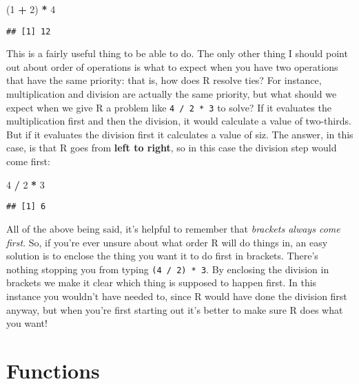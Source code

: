 \documentclass[]{book}
\newenvironment{Shaded}{\begin{snugshade}}{\end{snugshade}}
\newcommand{\DecValTok}[1]{\textcolor[rgb]{0.00,0.00,0.81}{#1}}
\newcommand{\NormalTok}[1]{#1}
\newcommand{\OperatorTok}[1]{\textcolor[rgb]{0.81,0.36,0.00}{\textbf{#1}}}
\newcommand{\StringTok}[1]{\textcolor[rgb]{0.31,0.60,0.02}{#1}}
\begin{document}
\begin{Shaded}
\begin{Highlighting}[]
\NormalTok{(}\DecValTok{1} \OperatorTok{+}\StringTok{ }\DecValTok{2}\NormalTok{) }\OperatorTok{*}\StringTok{ }\DecValTok{4}
\end{Highlighting}
\end{Shaded}

\begin{verbatim}
## [1] 12
\end{verbatim}

This is a fairly useful thing to be able to do. The only other thing I should point out about order of operations is what to expect when you have two operations that have the same priority: that is, how does R resolve ties? For instance, multiplication and division are actually the same priority, but what should we expect when we give R a problem like \texttt{4\ /\ 2\ *\ 3} to solve? If it evaluates the multiplication first and then the division, it would calculate a value of two-thirds. But if it evaluates the division first it calculates a value of siz. The answer, in this case, is that R goes from \textbf{left to right}, so in this case the division step would come first:

\begin{Shaded}
\begin{Highlighting}[]
\DecValTok{4} \OperatorTok{/}\StringTok{ }\DecValTok{2} \OperatorTok{*}\StringTok{ }\DecValTok{3}
\end{Highlighting}
\end{Shaded}

\begin{verbatim}
## [1] 6
\end{verbatim}

All of the above being said, it's helpful to remember that \emph{brackets always come first}. So, if you're ever unsure about what order R will do things in, an easy solution is to enclose the thing you want it to do first in brackets. There's nothing stopping you from typing \texttt{(4\ /\ 2)\ *\ 3}. By enclosing the division in brackets we make it clear which thing is supposed to happen first. In this instance you wouldn't have needed to, since R would have done the division first anyway, but when you're first starting out it's better to make sure R does what you want!

\hypertarget{functions}{%
\section{Functions}\label{functions}}
\end{document}
